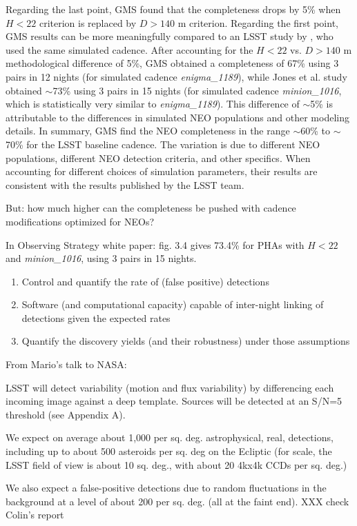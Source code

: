 Regarding the last point, GMS found that the completeness drops by 5\%
when $H<22$ criterion is replaced by $D>140$ m criterion. Regarding 
the first point, GMS results can be more meaningfully compared to an LSST
study by \cite{JJI2016}, who used the same simulated cadence. After accounting for 
the $H<22$ vs. $D>140$ m methodological difference of 5\%, GMS obtained a 
completeness of 67\% using 3 pairs in 12 nights (for simulated cadence {\it enigma\_1189}), while Jones et al. 
study obtained $\sim$73\% using 3 pairs in 15 nights (for simulated cadence {\it minion\_1016}, which is 
statistically very similar to {\it enigma\_1189}). This difference 
of $\sim$5\% is attributable to the differences in simulated NEO
populations and other modeling details. In summary, GMS find the NEO
completeness in the range $\sim$60\% to $\sim$70\% for the LSST
baseline cadence. The variation is due to different NEO populations,
different NEO detection criteria, and other specifics. When accounting 
for different choices of simulation parameters, their results are
consistent with the results published by the LSST team. 

But: how much higher can the completeness be pushed with cadence
modifications optimized for NEOs? 

In Observing Strategy white paper: fig. 3.4 gives 73.4\% for PHAs with 
$H<22$ and {\it minion\_1016}, using 3 pairs in 15 nights. 


\begin{enumerate} 
\item Control and quantify the rate of (false positive) detections
\item Software (and computational capacity) capable of inter-night linking of detections given the expected rates
\item Quantify the discovery yields (and their robustness) under those assumptions
\end{enumerate} 


From Mario's talk to NASA:

LSST will detect variability (motion and flux variability) by
differencing each incoming image against a deep template.
Sources will be detected at an S/N=5 threshold (see Appendix A). 

We expect on average about 1,000 per sq. deg. astrophysical, real,
detections, including up to about 500 asteroids per sq. deg on the 
Ecliptic (for scale, the LSST field of view is about 10 sq. deg., with 
about 20 4kx4k CCDs per sq. deg.)

We also expect a false-positive detections due to random
fluctuations in the background at a level of about 200 per
sq. deg. (all at the faint end).  XXX check Colin's report 


